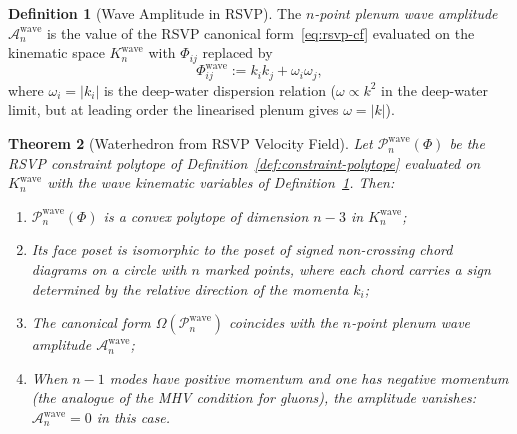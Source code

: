 \documentclass[12pt, oneside]{amsart}
\theoremstyle{plain}
\newtheorem{theorem}{Theorem}[section]
\theoremstyle{definition}
\newtheorem{definition}[theorem]{Definition}
\theoremstyle{remark}
\newcommand{\Amp}{\mathcal{A}}
\newcommand{\CF}{\Omega}   %
\begin{document}
\begin{definition}[Wave Amplitude in RSVP]
\label{def:wave-amplitude}
The \emph{$n$-point plenum wave amplitude} $\Amp_n^{\text{wave}}$ is the value of the RSVP canonical form~\eqref{eq:rsvp-cf} evaluated on the kinematic space $K_n^{\text{wave}}$ with $\Phi_{ij}$ replaced by
\[
  \Phi_{ij}^{\text{wave}} := k_i k_j + \omega_i \omega_j,
\]
where $\omega_i = |k_i|$ is the deep-water dispersion relation ($\omega \propto k^2$ in the deep-water limit, but at leading order the linearised plenum gives $\omega = |k|$).
\end{definition}

\begin{theorem}[Waterhedron from RSVP Velocity Field]
\label{thm:water}
Let $\mathcal{P}_n^{\text{wave}}(\Phi)$ be the RSVP constraint polytope of Definition~\ref{def:constraint-polytope} evaluated on $K_n^{\text{wave}}$ with the wave kinematic variables of Definition~\ref{def:wave-amplitude}. Then:
\begin{enumerate}[label=(\roman*)]
  \item $\mathcal{P}_n^{\text{wave}}(\Phi)$ is a convex polytope of dimension $n-3$ in $K_n^{\text{wave}}$;
  \item Its face poset is isomorphic to the poset of \emph{signed non-crossing chord diagrams} on a circle with $n$ marked points, where each chord carries a sign determined by the relative direction of the momenta $k_i$;
  \item The canonical form $\CF(\mathcal{P}_n^{\text{wave}})$ coincides with the $n$-point plenum wave amplitude $\Amp_n^{\text{wave}}$;
  \item When $n-1$ modes have positive momentum and one has negative momentum (the analogue of the MHV condition for gluons), the amplitude vanishes: $\Amp_n^{\text{wave}} = 0$ in this case.
\end{enumerate}
\end{theorem}
\end{document}
